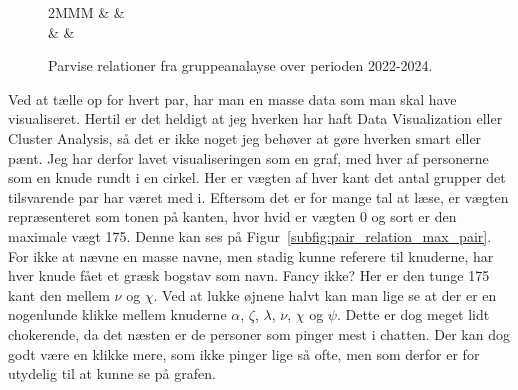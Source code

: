 \begin{article}
\begin{figure}[t!]
	\centering
	\begin{tabularx}{2\columnwidth}{MMM}
		\resizebox{.60\columnwidth}{!}{}
		&
		\resizebox{.60\columnwidth}{!}{}
		&
		\resizebox{.60\columnwidth}{!}{}
		\\
		\label{subfig:pair_relation_max_pair}
		&
		\label{subfig:pair_relation_group_count}
		&
		\label{subfig:pair_relation_max_group_count}
	\end{tabularx}
	\vspace{-20pt}
	\caption{Parvise relationer fra gruppeanalayse over perioden 2022-2024.}
	\label{fig:pair_relation}
\end{figure}

Ved at tælle op for hvert par, har man en masse data som man skal have visualiseret. Hertil er det heldigt at jeg hverken har haft Data Visualization eller Cluster Analysis, så det er ikke noget jeg behøver at gøre hverken smart eller pænt. Jeg har derfor lavet visualiseringen som en graf, med hver af personerne som en knude rundt i en cirkel. Her er vægten af hver kant det antal grupper det tilsvarende par har været med i. Eftersom det er for mange tal at læse, er vægten repræsenteret som tonen på kanten, hvor hvid er vægten 0 og sort er den maximale vægt 175.
Denne kan ses på Figur~\ref{subfig:pair_relation_max_pair}. For ikke at nævne en masse navne, men stadig kunne referere til knuderne, har hver knude fået et græsk bogstav som navn. Fancy ikke?
Her er den tunge 175 kant den mellem $\nu$ og $\chi$. Ved at lukke øjnene halvt kan man lige se at der er en nogenlunde klikke mellem knuderne $\alpha$, $\zeta$, $\lambda$, $\nu$, $\chi$ og $\psi$. Dette er dog meget lidt chokerende, da det næsten er de personer som pinger mest i chatten. Der kan dog godt være en klikke mere, som ikke pinger lige så ofte, men som derfor er for utydelig til at kunne se på grafen.


\end{article}
